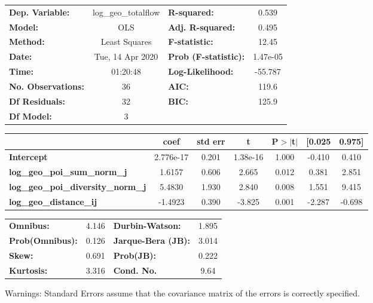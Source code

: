 \begin{center}
\begin{tabular}{lclc}
\toprule
\textbf{Dep. Variable:}                    & log\_geo\_totalflow & \textbf{  R-squared:         } &     0.539   \\
\textbf{Model:}                            &         OLS         & \textbf{  Adj. R-squared:    } &     0.495   \\
\textbf{Method:}                           &    Least Squares    & \textbf{  F-statistic:       } &     12.45   \\
\textbf{Date:}                             &   Tue, 14 Apr 2020  & \textbf{  Prob (F-statistic):} &  1.47e-05   \\
\textbf{Time:}                             &       01:20:48      & \textbf{  Log-Likelihood:    } &   -55.787   \\
\textbf{No. Observations:}                 &            36       & \textbf{  AIC:               } &     119.6   \\
\textbf{Df Residuals:}                     &            32       & \textbf{  BIC:               } &     125.9   \\
\textbf{Df Model:}                         &             3       & \textbf{                     } &             \\
\bottomrule
\end{tabular}
\begin{tabular}{lcccccc}
                                           & \textbf{coef} & \textbf{std err} & \textbf{t} & \textbf{P$> |$t$|$} & \textbf{[0.025} & \textbf{0.975]}  \\
\midrule
\textbf{Intercept}                         &    2.776e-17  &        0.201     &  1.38e-16  &         1.000        &       -0.410    &        0.410     \\
\textbf{log\_geo\_poi\_sum\_norm\_j}       &       1.6157  &        0.606     &     2.665  &         0.012        &        0.381    &        2.851     \\
\textbf{log\_geo\_poi\_diversity\_norm\_j} &       5.4830  &        1.930     &     2.840  &         0.008        &        1.551    &        9.415     \\
\textbf{log\_geo\_distance\_ij}            &      -1.4923  &        0.390     &    -3.825  &         0.001        &       -2.287    &       -0.698     \\
\bottomrule
\end{tabular}
\begin{tabular}{lclc}
\textbf{Omnibus:}       &  4.146 & \textbf{  Durbin-Watson:     } &    1.895  \\
\textbf{Prob(Omnibus):} &  0.126 & \textbf{  Jarque-Bera (JB):  } &    3.014  \\
\textbf{Skew:}          &  0.691 & \textbf{  Prob(JB):          } &    0.222  \\
\textbf{Kurtosis:}      &  3.316 & \textbf{  Cond. No.          } &     9.64  \\
\bottomrule
\end{tabular}
\end{center}

Warnings: \newline
 [1] Standard Errors assume that the covariance matrix of the errors is correctly specified.